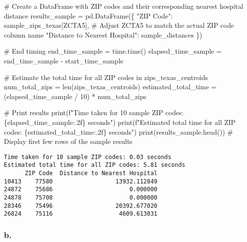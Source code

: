 \documentclass[
  letterpaper,
  DIV=11,
  numbers=noendperiod]{scrartcl}
\newenvironment{Shaded}{\begin{snugshade}}{\end{snugshade}}
\newcommand{\BuiltInTok}[1]{\textcolor[rgb]{0.00,0.23,0.31}{#1}}
\newcommand{\CommentTok}[1]{\textcolor[rgb]{0.37,0.37,0.37}{#1}}
\newcommand{\DecValTok}[1]{\textcolor[rgb]{0.68,0.00,0.00}{#1}}
\newcommand{\NormalTok}[1]{\textcolor[rgb]{0.00,0.23,0.31}{#1}}
\newcommand{\OperatorTok}[1]{\textcolor[rgb]{0.37,0.37,0.37}{#1}}
\newcommand{\SpecialCharTok}[1]{\textcolor[rgb]{0.37,0.37,0.37}{#1}}
\newcommand{\SpecialStringTok}[1]{\textcolor[rgb]{0.13,0.47,0.30}{#1}}
\newcommand{\StringTok}[1]{\textcolor[rgb]{0.13,0.47,0.30}{#1}}
\begin{document}
\begin{Shaded}
\begin{Highlighting}[]
\CommentTok{\# Create a DataFrame with ZIP codes and their corresponding nearest hospital distance}
\NormalTok{results\_sample }\OperatorTok{=}\NormalTok{ pd.DataFrame(\{}
    \StringTok{"ZIP Code"}\NormalTok{: sample\_zips\_texas[}\StringTok{\textquotesingle{}ZCTA5\textquotesingle{}}\NormalTok{],  }\CommentTok{\# Adjust \textquotesingle{}ZCTA5\textquotesingle{} to match the actual ZIP code column name}
    \StringTok{"Distance to Nearest Hospital"}\NormalTok{: sample\_distances}
\NormalTok{\})}

\CommentTok{\# End timing}
\NormalTok{end\_time\_sample }\OperatorTok{=}\NormalTok{ time.time()}
\NormalTok{elapsed\_time\_sample }\OperatorTok{=}\NormalTok{ end\_time\_sample }\OperatorTok{{-}}\NormalTok{ start\_time\_sample}

\CommentTok{\# Estimate the total time for all ZIP codes in zips\_texas\_centroids}
\NormalTok{num\_total\_zips }\OperatorTok{=} \BuiltInTok{len}\NormalTok{(zips\_texas\_centroids)}
\NormalTok{estimated\_total\_time }\OperatorTok{=}\NormalTok{ (elapsed\_time\_sample }\OperatorTok{/} \DecValTok{10}\NormalTok{) }\OperatorTok{*}\NormalTok{ num\_total\_zips}

\CommentTok{\# Print results}
\BuiltInTok{print}\NormalTok{(}\SpecialStringTok{f"Time taken for 10 sample ZIP codes: }\SpecialCharTok{\{}\NormalTok{elapsed\_time\_sample}\SpecialCharTok{:.2f\}}\SpecialStringTok{ seconds"}\NormalTok{)}
\BuiltInTok{print}\NormalTok{(}\SpecialStringTok{f"Estimated total time for all ZIP codes: }\SpecialCharTok{\{}\NormalTok{estimated\_total\_time}\SpecialCharTok{:.2f\}}\SpecialStringTok{ seconds"}\NormalTok{)}
\BuiltInTok{print}\NormalTok{(results\_sample.head())  }\CommentTok{\# Display first few rows of the sample results}
\end{Highlighting}
\end{Shaded}

\begin{verbatim}
Time taken for 10 sample ZIP codes: 0.03 seconds
Estimated total time for all ZIP codes: 5.81 seconds
      ZIP Code  Distance to Nearest Hospital
10413    77580                  13932.112849
24872    75686                      0.000000
24878    75708                      0.000000
28346    75496                  20392.677020
26824    75116                   4609.613031
\end{verbatim}

\subsubsection{b.}\label{b.-1}
\end{document}
